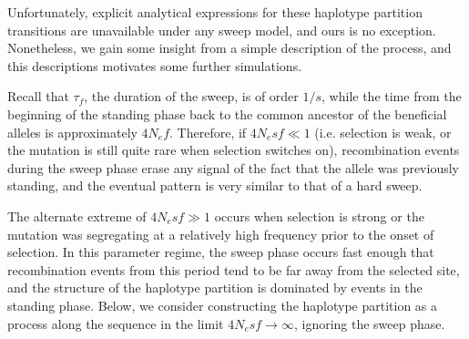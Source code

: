 \documentclass[a4paper,10pt]{article}
\begin{document}
Unfortunately, explicit analytical expressions for these haplotype partition transitions are unavailable under any sweep model, and ours is no exception. Nonetheless, we gain some insight from a simple description of the process, and this descriptions motivates some further simulations.

Recall that $\tau_{f}$, the duration of the sweep, is of order $1/s$, while the time from the beginning of the standing phase back to the common ancestor of the beneficial alleles is approximately $4N_e f$. Therefore, if $4N_e s f \ll 1$ (i.e. selection is weak, or the mutation is still quite rare when selection switches on), recombination events during the sweep phase erase any signal of the fact that the allele was previously standing, and the eventual pattern is very similar to that of a hard sweep.

The alternate extreme of $4N_e s f \gg 1$ occurs when selection is strong or the mutation was segregating at a relatively high frequency prior to the onset of selection. In this parameter regime, the sweep phase occurs fast enough that recombination events from this period tend to be far away from the selected site, and the structure of the haplotype partition is dominated by events in the standing phase. Below, we consider constructing the haplotype partition as a process along the sequence in the limit $4N_e s f \rightarrow \infty$, ignoring the sweep phase. 
\end{document}
